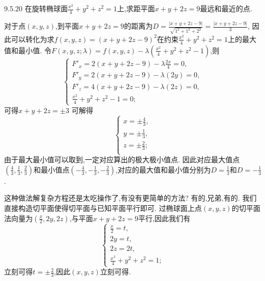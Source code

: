 \begin{exercise}{9.5.20}
    在旋转椭球面$\frac{x^2}{4}+y^2+z^2=1$上,求距平面$x+y+2z=9$最远和最近的点.
\end{exercise}
\begin{solution}
    对于点$(x,y,z)$,到平面$x+y+2z=9$的距离为$D=\frac{|x+y+2z-9|}{\sqrt{1^2+1^2+2^2}}=\frac{|x+y+2z-9|}{3}$,
    因此可以转化为求$f(x,y,z)=(x+y+2z-9)^2$在约束$\frac{x^2}{4}+y^2+z^2=1$上的最大值和最小值.
    令$F(x,y,z;\lambda)=f(x,y,z)-\lambda(\frac{x^2}{4}+y^2+z^2-1)$,则$$\begin{cases}
        F'_x=2(x+y+2z-9)-\lambda\frac{2x}{4}=0,\\
        F'_y=2(x+y+2z-9)-\lambda(2y)=0,\\
        F'_z=4(x+y+2z-9)-\lambda(2z)=0,\\
        \frac{x^2}{4}+y^2+z^2-1=0;
    \end{cases}$$
    可得$x+y+2z=\pm 3$
    可解得$$\begin{cases}
        x=\pm \frac{4}{3},\\
        y=\pm \frac{1}{3},\\
        z=\pm \frac{2}{3};\\
    \end{cases}$$
    由于最大最小值可以取到,一定对应算出的极大极小值点.
    因此对应最大值点$(\frac{4}{3},\frac{1}{3},\frac{2}{3})$和最小值点$(-\frac{4}{3},-\frac{1}{3},-\frac{2}{3})$,对应的最大值和最小值分别为$D=\frac{1}{3}$和$D=-\frac{1}{3}$.

    这种做法解复杂方程还是太吃操作了,有没有更简单的方法?
    有的,兄弟,有的.
    我们直接构造切平面使得切平面与已知平面平行即可.
    过椭球面上点$(x,y,z)$的切平面法向量为$(\frac{x}{2},2y,2z)$,与平面$x+y+2z=9$平行,因此我们有
    $$\begin{cases}
        \frac{x}{2}=t,\\
        2y=t,\\
        2z=2t,\\
        \frac{x^2}{4}+y^2+z^2=1;
    \end{cases}$$
    立刻可得$t=\pm \frac{2}{3}$,因此$(x,y,z)$立刻可得.
\end{solution}
